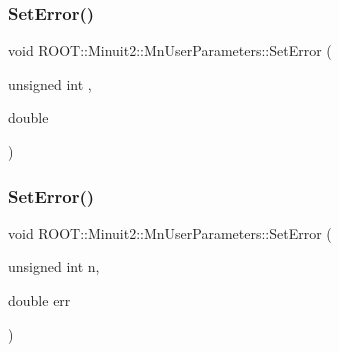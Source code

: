 \subsubsection{\texorpdfstring{SetError()}{SetError()}\hspace{0.1cm}{\footnotesize\ttfamily [1/4]}}
{\footnotesize\ttfamily void R\+O\+O\+T\+::\+Minuit2\+::\+Mn\+User\+Parameters\+::\+Set\+Error (\begin{DoxyParamCaption}\item[{unsigned int}]{,  }\item[{double}]{ }\end{DoxyParamCaption})}

\mbox{\label{classROOT_1_1Minuit2_1_1MnUserParameters_a64cbb6833d91d7f3bdef5b4dec9ae20f}} 
\subsubsection{\texorpdfstring{SetError()}{SetError()}\hspace{0.1cm}{\footnotesize\ttfamily [2/4]}}
{\footnotesize\ttfamily void R\+O\+O\+T\+::\+Minuit2\+::\+Mn\+User\+Parameters\+::\+Set\+Error (\begin{DoxyParamCaption}\item[{unsigned int}]{n,  }\item[{double}]{err }\end{DoxyParamCaption})}

